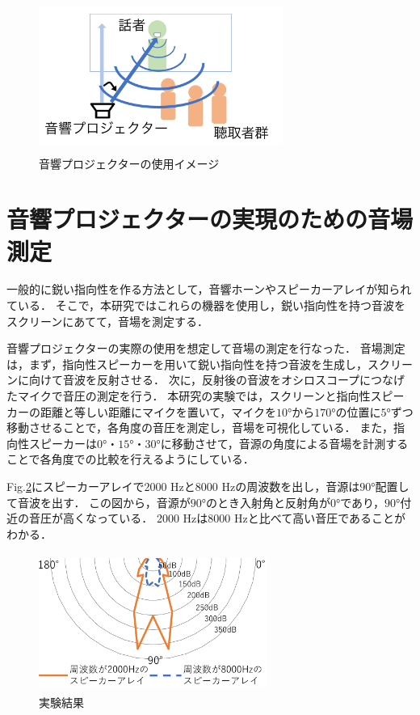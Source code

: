 \documentclass[twocolumn,11pt,a4j]{ltjsarticle}
\begin{document}
\vspace{1ex}
\begin{figure}[h]
\begin{center}
 \includegraphics[clip,width=80mm,height=50mm]{onkyouP.pdf}
\end{center}
 \caption{音響プロジェクターの使用イメージ}
 \label{fig:音響プロジェクター}
\end{figure}



\section{音響プロジェクターの実現のための音場測定}

一般的に鋭い指向性を作る方法として，音響ホーンやスピーカーアレイが知られている．
そこで，本研究ではこれらの機器を使用し，鋭い指向性を持つ音波をスクリーンにあてて，音場を測定する．

音響プロジェクターの実際の使用を想定して音場の測定を行なった．
音場測定は，まず，指向性スピーカーを用いて鋭い指向性を持つ音波を生成し，スクリーンに向けて音波を反射させる．
次に，反射後の音波をオシロスコープにつなげたマイクで音圧の測定を行う．
本研究の実験では，スクリーンと指向性スピーカーの距離と等しい距離にマイクを置いて，マイクを$\ang{10}$から$\ang{170}$の位置に$\ang{5}$ずつ移動させることで，各角度の音圧を測定し，音場を可視化している．
また，指向性スピーカーは$\ang{0}$・$\ang{15}$・$\ang{30}$に移動させて，音源の角度による音場を計測することで各角度での比較を行えるようにしている．


Fig.\ref{fig:結果}にスピーカーアレイで2000 Hzと8000 Hzの周波数を出し，音源は$\ang{90}$配置して音波を出す．
この図から，音源が$\ang{90}$のとき入射角と反射角が$\ang{0}$であり，$\ang{90}$付近の音圧が高くなっている．
2000 Hzは8000 Hzと比べて高い音圧であることがわかる．

\vspace{1ex}
\begin{figure}[h]
\begin{center}
 \includegraphics[clip,width=75mm,height=45mm]{keltuka4.pdf}
\end{center}
 \caption{実験結果}
 \label{fig:結果}
\end{figure}
\end{document}

